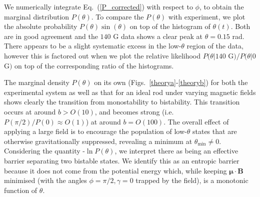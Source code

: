 \documentclass[aps,prl,reprint,twocolumn,superscriptaddress,showpacs]{revtex4-1}
\newcommand{\vcrm}[1]{\mathbf{#1}}
\newcommand{\vc}[1]{\boldsymbol{#1}}
\begin{document}
We numerically integrate Eq.\ (\ref{P_corrected}) with respect to $\phi$, to obtain the marginal distribution $P(\theta)$. To compare the $P(\theta)$ with experiment, we plot the absolute probability $P(\theta)\sin(\theta)$ on top of the histogram of $\theta(t)$. Both are in good agreement and the $140$ G data shows a clear peak at $\theta=0.15$ rad. There appears to be a slight systematic excess in the low-$\theta$ region of the data, however this is factored out when we plot the relative likelihood $P(\theta | 140$ G$)/P(\theta | 0$ G$)$ on top of the corresponding ratio of the histograms. 

The marginal density $P(\theta)$ on its own (Figs.\ \ref{theorya}-\ref{theoryb}) for both the experimental system as well as that for an ideal rod under varying magnetic fields shows clearly the transition from monostability to bistability. This transition occurs at around $b > O(10)$, and becomes strong (i.e.\ $P(\pi/2)/P(0) \approx O(1)$) at around $b=O(100)$. The overall effect of applying a large field is to encourage the population of low-$\theta$ states that are otherwise gravitationally suppressed, revealing a minimum at $\theta_{\text{min}}\ne 0$. Considering the quantity -$\ln P(\theta)$, we interpret there as being an effective barrier separating two bistable states. We identify this as an entropic barrier because it does not come from the potential energy which, while keeping $\vc{\mu}\cdot\vcrm{B}$ minimised (with the angles $\phi=\pi/2,\gamma=0$ trapped by the field), is a monotonic function of $\theta$.
\end{document}
